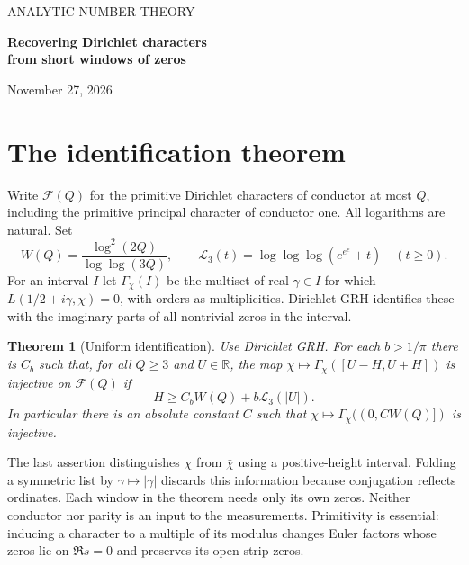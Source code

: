 \documentclass[11pt]{article}
\newtheorem{theorem}{Theorem}[section]
\newcommand{\R}{\mathbb R}
\newcommand{\FQ}{\mathcal F(Q)}
\newcommand{\Lthree}{\mathcal L_3}
\begin{document}
\begin{center}
{\small\sffamily\color{teal!70!black} ANALYTIC NUMBER THEORY}\par\vspace{9pt}
{\LARGE\bfseries Recovering Dirichlet characters\\[3pt]from short windows of zeros}\par\vspace{9pt}
{\normalsize November 27, 2026}
\end{center}
\begin{abstract}
For every $Q\ge3$, the positive ordinates up to height
$O(\log^2(2Q)/\log\log(3Q))$, counted with multiplicity, distinguish all primitive
Dirichlet characters of conductor at most $Q$. The result includes conjugate complex
characters and the conductor-one character. It uses Dirichlet GRH in its critical-line
form. A translated window centered at $U$ works with half-length enlarged by
$b\log\log\log |U|$ for any $b>1/\pi$ and large $|U|$. The proof uses a smooth
explicit formula together with an upper-bound sieve for pairs of primes.
Many small primes separate each pair of characters, so individual nearby prime powers
can be tolerated on average. We give a quantitative lower bound for the cost of
matching the two lists of ordinates and a finite-alphabet version of the recovery.
\end{abstract}
\section{The identification theorem}
Write $\FQ$ for the primitive Dirichlet characters of conductor at most $Q$, including
the primitive principal character of conductor one. All logarithms are natural. Set
\[
 W(Q)=\frac{\log^2(2Q)}{\log\log(3Q)},\qquad
 \Lthree(t)=\log\log\log(e^{e^e}+t)\quad(t\ge0).
\]
For an interval $I$ let $\Gamma_\chi(I)$ be the multiset of real $\gamma\in I$ for
which $L(1/2+i\gamma,\chi)=0$, with orders as multiplicities. Dirichlet GRH identifies
these with the imaginary parts of all nontrivial zeros in the interval.
\begin{theorem}[Uniform identification]\label{thm:main}
Use Dirichlet GRH. For each $b>1/\pi$ there is $C_b$ such that, for all $Q\ge3$
and $U\in\R$, the map $\chi\mapsto\Gamma_\chi([U-H,U+H])$ is injective on $\FQ$ if
\begin{equation}\label{eq:H}
 H\ge C_b W(Q)+b\Lthree(|U|).
\end{equation}
In particular there is an absolute constant $C$ such that
$\chi\mapsto\Gamma_\chi((0,CW(Q)])$ is injective.
\end{theorem}
The last assertion distinguishes $\chi$ from $\bar\chi$ using a positive-height
interval. Folding a symmetric list by $\gamma\mapsto|\gamma|$ discards this
information because conjugation reflects ordinates. Each window in the theorem needs
only its own zeros. Neither conductor nor parity is an input to the measurements.
Primitivity is essential: inducing a character to a multiple of its modulus changes
Euler factors whose zeros lie on $\Re s=0$ and preserves its open-strip zeros.
\end{document}
